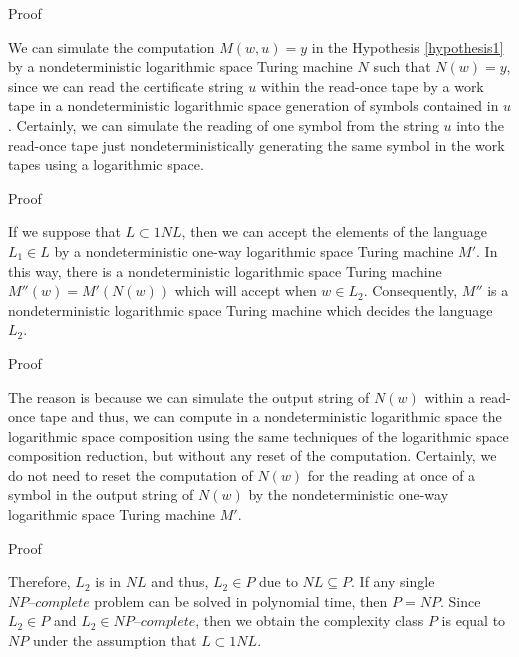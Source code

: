 \documentclass[11pt]{beamer}
\begin{document}
\begin{frame}{Proof}

We can simulate the computation $M(w, u) = y$ in the Hypothesis \ref{hypothesis1} by a nondeterministic logarithmic space Turing machine $N$ such that $N(w) = y$, since we can read the certificate string $u$ within the read-once tape by a work tape in a nondeterministic logarithmic space generation of symbols contained in $u$. Certainly, we can simulate the reading of one symbol from the string $u$ into the read-once tape just nondeterministically generating the same symbol in the work tapes using a logarithmic space.

\end{frame}

\begin{frame}{Proof}

If we suppose that $L \subset 1NL$, then we can accept the elements of the language $L_{1} \in L$ by a nondeterministic one-way logarithmic space Turing machine $M'$. In this way, there is a nondeterministic logarithmic space Turing machine $M''(w) = M'(N(w))$ which will accept when $w \in L_{2}$. Consequently, $M''$ is a nondeterministic logarithmic space Turing machine which decides the language $L_{2}$.

\end{frame}

\begin{frame}{Proof}

The reason is because we can simulate the output string of $N(w)$ within a read-once tape and thus, we can compute in a nondeterministic logarithmic space the logarithmic space composition using the same techniques of the logarithmic space composition reduction, but without any reset of the computation. Certainly, we do not need to reset the computation of $N(w)$ for the reading at once of a symbol in the output string of $N(w)$ by the nondeterministic one-way logarithmic space Turing machine $M'$.

\end{frame}


\begin{frame}{Proof}

Therefore, $L_{2}$ is in $NL$ and thus, $L_{2} \in P$ due to $NL \subseteq P$. If any single $\textit{NP--complete}$ problem can be solved in polynomial time, then $P = NP$. Since $L_{2} \in P$ and $L_{2} \in \textit{NP--complete}$, then we obtain the complexity class $P$ is equal to $NP$ under the assumption that $L \subset 1NL$.

\end{frame}
\end{document}
